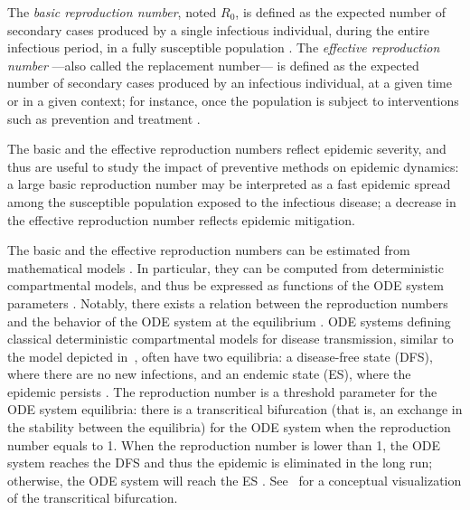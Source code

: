 The \textit{basic reproduction number}, noted $R_0$, is defined as the expected number of secondary cases produced by a single infectious individual, during the entire infectious period, in a fully susceptible population \cite[]{Anderson1991,Heesterbeek2002}. The \textit{effective reproduction number} ---also called the replacement number--- is defined as the expected number of secondary cases produced by an infectious individual, at a given time or in a given context; for instance, once the population is subject to interventions such as prevention and treatment \cite[]{Ridenhour2018,VanDenDriessche2008,VanDenDriessche2002,Hethcote2000}. %

The basic and the effective reproduction numbers reflect epidemic severity, and thus are useful to study the impact of preventive methods on epidemic dynamics: a large basic reproduction number may be interpreted as a fast epidemic spread among the susceptible population exposed to the infectious disease; a decrease in the effective reproduction number reflects epidemic mitigation. 

The basic and the effective reproduction numbers can be estimated from mathematical models \cite[]{Ridenhour2018}. In particular, they can be computed from deterministic compartmental models, and thus be expressed as functions of the ODE system parameters \cite[]{Heffernan2005}. Notably, there exists a relation between the reproduction numbers and the behavior of the ODE system at the equilibrium \cite[]{VanDenDriessche2002,VanDenDriessche2008}. ODE systems defining classical deterministic compartmental models for disease transmission, similar to the model depicted in~, often have two equilibria: a disease-free state (DFS), where there are no new infections, and an endemic state (ES), where the epidemic persists \cite[]{Hethcote2000,VanDenDriessche2002}. The reproduction number is a threshold parameter for the ODE system equilibria: there is a transcritical bifurcation (that is, an exchange in the stability between the equilibria) for the ODE system when the reproduction number equals to 1. When the reproduction number is lower than 1, the ODE system reaches the DFS and thus the epidemic is eliminated in the long run; otherwise, the ODE system will reach the ES \cite[]{Hethcote2000,VanDenDriessche2002}\footnotemark. See~ for a conceptual visualization of the transcritical bifurcation.

